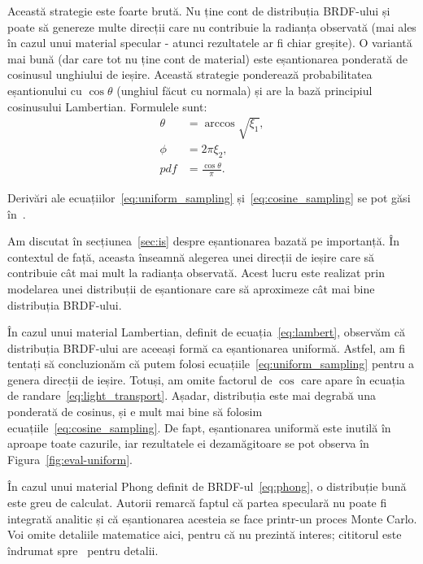 \documentclass[12pt,a4paper]{report}
\numberwithin{equation}{section} %
\begin{document}
Această strategie este foarte brută. Nu ține cont de distribuția BRDF-ului și
poate să genereze multe direcții care nu contribuie la radianța observată (mai ales
în cazul unui material specular - atunci rezultatele ar fi chiar greșite). O variantă mai bună (dar care tot nu ține cont de material) este eșantionarea ponderată
de cosinusul unghiului de ieșire. Această strategie ponderează probabilitatea
eșantionului cu $\cos \theta$ (unghiul făcut cu normala) și are la bază principiul
cosinusului Lambertian. Formulele sunt:
\begin{equation}\label{eq:cosine_sampling}
	\begin{aligned}
		\theta & = \arccos \sqrt{\xi_1},    \\
		\phi   & = 2\pi \xi_2,              \\
		pdf    & = \frac{\cos \theta}{\pi}.
	\end{aligned}
\end{equation}

Derivări ale ecuațiilor~\ref{eq:uniform_sampling} și~\ref{eq:cosine_sampling} se pot găsi
în~\cite{sampling}.

Am discutat în secțiunea~\ref{sec:is} despre eșantionarea bazată pe importanță.
În contextul de față, aceasta înseamnă alegerea unei direcții de ieșire care să
contribuie cât mai mult la radianța observată. Acest lucru este realizat prin
modelarea unei distribuții de eșantionare care să aproximeze cât mai bine distribuția
BRDF-ului.

În cazul unui material Lambertian, definit de ecuația~\ref{eq:lambert}, observăm
că distribuția BRDF-ului are aceeași formă ca eșantionarea
uniformă. Astfel, am fi tentați să concluzionăm că putem folosi
ecuațiile~\ref{eq:uniform_sampling} pentru a genera direcții de ieșire. Totuși,
am omite factorul de $\cos$ care apare în ecuația de randare~\ref{eq:light_transport}.
Așadar, distribuția este mai degrabă una ponderată de cosinus, și e mult mai bine
să folosim ecuațiile~\ref{eq:cosine_sampling}. De fapt, eșantionarea uniformă este
inutilă în aproape toate cazurile, iar rezultatele ei dezamăgitoare se pot
observa în Figura~\ref{fig:eval-uniform}.

În cazul unui material Phong definit de BRDF-ul~\ref{eq:phong}, o distribuție
bună este greu de calculat. Autorii remarcă faptul că partea speculară nu poate
fi integrată analitic și că eșantionarea acesteia se face printr-un proces
Monte Carlo. Voi omite detaliile matematice aici, pentru că nu prezintă interes;
cititorul este îndrumat spre~\cite{Lafortune} pentru detalii.
\end{document}
